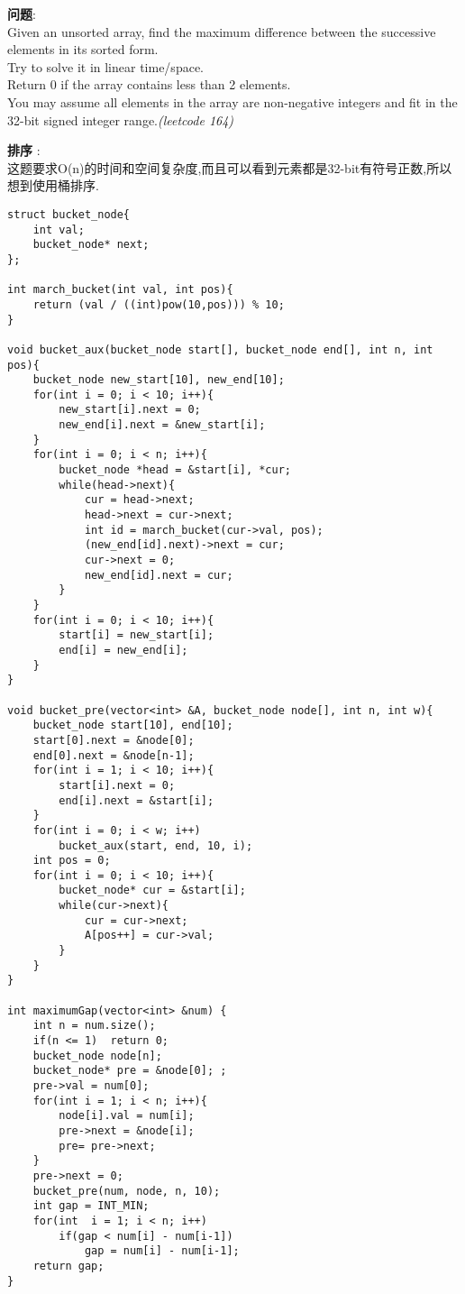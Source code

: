     
\begin{description}
    \item{\textbf{问题}}:\\
Given an unsorted array, find the maximum difference between the successive elements in its sorted form.\\
Try to solve it in linear time/space.\\
Return 0 if the array contains less than 2 elements.\\
You may assume all elements in the array are non-negative integers and fit in the 32-bit signed integer range.\textit{(leetcode 164)}
    \item{\textbf{排序}} : 
    \\这题要求O(n)的时间和空间复杂度,而且可以看到元素都是32-bit有符号正数,所以想到使用桶排序.
    \begin{lstlisting}
struct bucket_node{
	int val;
	bucket_node* next;
};

int march_bucket(int val, int pos){
	return (val / ((int)pow(10,pos))) % 10;
}

void bucket_aux(bucket_node start[], bucket_node end[], int n, int pos){
	bucket_node new_start[10], new_end[10];
	for(int i = 0; i < 10; i++){
		new_start[i].next = 0;
		new_end[i].next = &new_start[i];
	}
	for(int i = 0; i < n; i++){
		bucket_node *head = &start[i], *cur;
		while(head->next){
			cur = head->next;
			head->next = cur->next;
			int id = march_bucket(cur->val, pos);
			(new_end[id].next)->next = cur;
			cur->next = 0;
			new_end[id].next = cur;
		}
	}
	for(int i = 0; i < 10; i++){
		start[i] = new_start[i];
		end[i] = new_end[i];
	}
}

void bucket_pre(vector<int> &A, bucket_node node[], int n, int w){
	bucket_node start[10], end[10];
	start[0].next = &node[0];
	end[0].next = &node[n-1];
	for(int i = 1; i < 10; i++){
		start[i].next = 0;
		end[i].next = &start[i];
	}
	for(int i = 0; i < w; i++)
		bucket_aux(start, end, 10, i);
	int pos = 0;
	for(int i = 0; i < 10; i++){
		bucket_node* cur = &start[i];
		while(cur->next){
			cur = cur->next;
			A[pos++] = cur->val;
		}
	}
}

int maximumGap(vector<int> &num) {
	int n = num.size();
	if(n <= 1)	return 0;
	bucket_node node[n];
	bucket_node* pre = &node[0]; ;
	pre->val = num[0];
	for(int i = 1; i < n; i++){
		node[i].val = num[i];
		pre->next = &node[i];
		pre= pre->next;
	}
	pre->next = 0;
	bucket_pre(num, node, n, 10);
	int gap = INT_MIN;
	for(int  i = 1; i < n; i++)
		if(gap < num[i] - num[i-1])
			gap = num[i] - num[i-1];
	return gap;
}
    \end{lstlisting}
\end{description}

